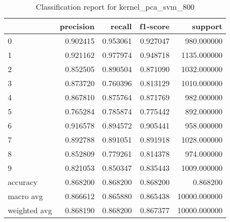 \begin{table}[htb!]
\centering
\caption{Classification report for kernel_pca_svm_800}
\label{tab:classification-report-kernel_pca_svm_800}
\begin{tabular}{lrrrr}
\toprule
 & precision & recall & f1-score & support \\
\midrule
0 & 0.902415 & 0.953061 & 0.927047 & 980.000000 \\
1 & 0.921162 & 0.977974 & 0.948718 & 1135.000000 \\
2 & 0.852505 & 0.890504 & 0.871090 & 1032.000000 \\
3 & 0.873720 & 0.760396 & 0.813129 & 1010.000000 \\
4 & 0.867810 & 0.875764 & 0.871769 & 982.000000 \\
5 & 0.765284 & 0.785874 & 0.775442 & 892.000000 \\
6 & 0.916578 & 0.894572 & 0.905441 & 958.000000 \\
7 & 0.892788 & 0.891051 & 0.891918 & 1028.000000 \\
8 & 0.852809 & 0.779261 & 0.814378 & 974.000000 \\
9 & 0.821053 & 0.850347 & 0.835443 & 1009.000000 \\
accuracy & 0.868200 & 0.868200 & 0.868200 & 0.868200 \\
macro avg & 0.866612 & 0.865880 & 0.865438 & 10000.000000 \\
weighted avg & 0.868190 & 0.868200 & 0.867377 & 10000.000000 \\
\bottomrule
\end{tabular}
\end{table}
